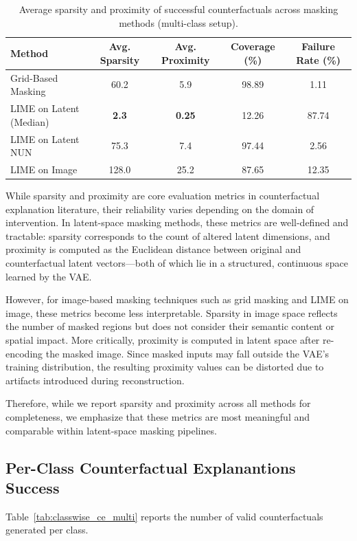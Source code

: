 \begin{table}[htbp]
\centering
\small
\begin{tabular}{lcccc}
\toprule
\textbf{Method} & \textbf{Avg. Sparsity} & \textbf{Avg. Proximity} & \textbf{Coverage (\%)} & \textbf{Failure Rate (\%)} \\
\midrule
Grid-Based Masking       & 60.2    & 5.9   & 98.89 & 1.11 \\
LIME on Latent (Median)  & \textbf{2.3}     & \textbf{0.25}  & 12.26 & 87.74 \\
LIME on Latent NUN       & 75.3    & 7.4   & 97.44 & 2.56 \\
LIME on Image            & 128.0   & 25.2  & 87.65 & 12.35 \\
\bottomrule
\end{tabular}
\caption{Average sparsity and proximity of successful counterfactuals across masking methods (multi-class setup).}
\label{tab:sparsity_proximity}
\end{table}

\vspace{0.8em}

While sparsity and proximity are core evaluation metrics in counterfactual explanation literature, their reliability varies depending on the domain of intervention. In latent-space masking methods, these metrics are well-defined and tractable: sparsity corresponds to the count of altered latent dimensions, and proximity is computed as the Euclidean distance between original and counterfactual latent vectors—both of which lie in a structured, continuous space learned by the VAE.

However, for image-based masking techniques such as grid masking and LIME on image, these metrics become less interpretable. Sparsity in image space reflects the number of masked regions but does not consider their semantic content or spatial impact. More critically, proximity is computed in latent space after re-encoding the masked image. Since masked inputs may fall outside the VAE's training distribution, the resulting proximity values can be distorted due to artifacts introduced during reconstruction.

Therefore, while we report sparsity and proximity across all methods for completeness, we emphasize that these metrics are most meaningful and comparable within latent-space masking pipelines.




\subsection{Per-Class Counterfactual Explanantions Success}
Table~\ref{tab:classwise_ce_multi} reports the number of valid counterfactuals generated per class.

